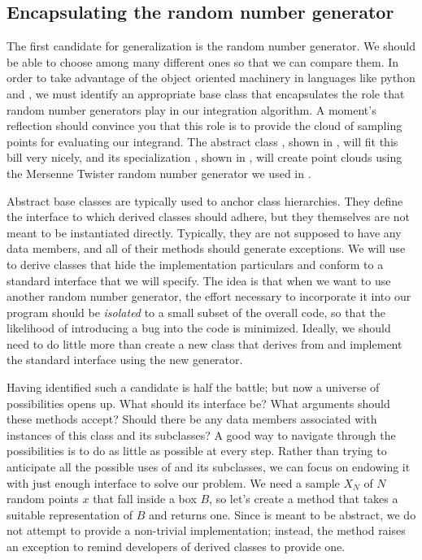 \subsection{Encapsulating the random number generator}
\label{sec:classes:pointcloud}

The first candidate for generalization is the random number generator. We should be able to
choose among many different ones so that we can compare them. In order to take advantage of the
object oriented machinery in languages like python and \cpp, we must identify an appropriate
base class that encapsulates the role that random number generators play in our integration
algorithm. A moment's reflection should convince you that this role is to provide the cloud of
sampling points for evaluating our integrand. The abstract class , shown in
, will fit this bill very nicely, and its specialization
, shown in , will create point clouds using the
Mersenne Twister random number generator we used in .

Abstract base classes are typically used to anchor class hierarchies. They define the interface
to which derived classes should adhere, but they themselves are not meant to be instantiated
directly. Typically, they are not supposed to have any data members, and all of their methods
should generate exceptions. We will use  to derive classes that hide the
implementation particulars and conform to a standard interface that we will specify.  The idea
is that when we want to use another random number generator, the effort necessary to
incorporate it into our program should be {\em isolated} to a small subset of the overall code,
so that the likelihood of introducing a bug into the code is minimized.  Ideally, we should
need to do little more than create a new class that derives from  and
implement the standard interface using the new generator.

Having identified such a candidate is half the battle; but now a universe of possibilities
opens up. What should its interface be? What arguments should these methods accept? Should
there be any data members associated with instances of this class and its subclasses? A good
way to navigate through the possibilities is to do as little as possible at every step. Rather
than trying to anticipate all the possible uses of  and its subclasses, we
can focus on endowing it with just enough interface to solve our problem. We need a sample
$X_{N}$ of $N$ random points $x$ that fall inside a box $B$, so let's create a method
 that takes a suitable representation of $B$ and returns one.
%
%
Since  is meant to be abstract, we do not attempt to provide a non-trivial
implementation; instead, the method  raises an exception to remind developers of
derived classes to provide one.

